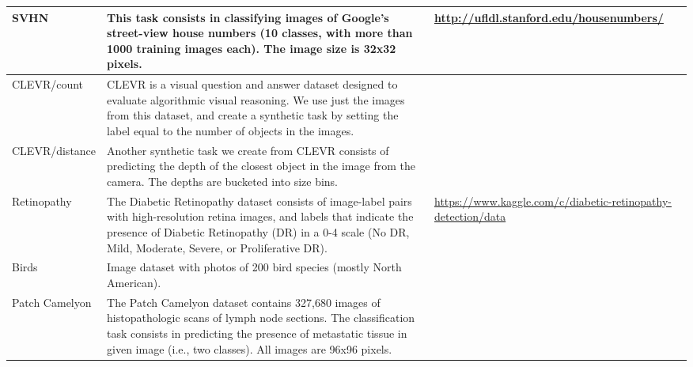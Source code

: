 \begin{table}[ht]
{{\begin{tabular}{l p{12cm} p{5cm}}
      SVHN & This task consists in classifying images of Google’s street-view house numbers (10 classes, with more than 1000 training images each). The image size is 32x32 pixels.& \url{http://ufldl.stanford.edu/housenumbers/}\\ \midrule
      CLEVR/count & CLEVR is a visual question and answer dataset designed to evaluate algorithmic visual reasoning. We use just the images from this dataset, and create a synthetic task by setting the label equal to the number of objects in the images.& ~\citep{johnson2017clevr}\\ \midrule
      CLEVR/distance & Another synthetic task we create from CLEVR consists of predicting the depth of the closest object in the image from the camera. The depths are bucketed into size bins. &~\citep{johnson2017clevr}\\ \midrule
      Retinopathy & The Diabetic Retinopathy dataset consists of image-label pairs with high-resolution retina images, and labels that indicate the presence of Diabetic Retinopathy (DR) in a 0-4 scale (No DR, Mild, Moderate, Severe, or Proliferative DR). & \url{https://www.kaggle.com/c/diabetic-retinopathy-detection/data} \\ \midrule 
      Birds &  Image dataset with photos of 200 bird species (mostly North American). &~\citep{WahCUB_200_2011} \\ \midrule
      
      Patch Camelyon & The Patch Camelyon dataset contains 327,680 images of histopathologic scans of lymph node sections. The classification task consists in predicting the presence of metastatic tissue in given image (i.e., two classes). All images are 96x96 pixels. &~\citep{teh2019metric}\\ \midrule
      

\end{tabular}}}
\end{table}
